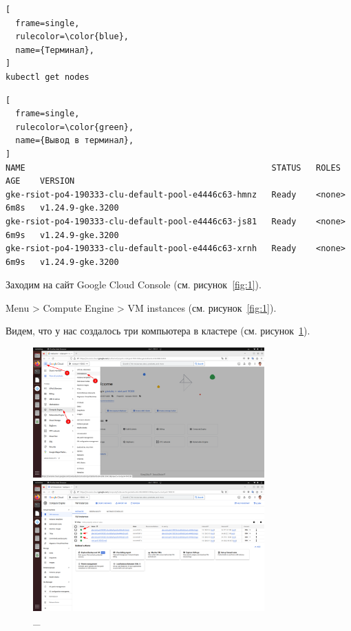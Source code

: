 \documentclass[12pt, a4paper, simple]{eskdtext}
\begin{document}
\newpage

\begin{lstlisting}[
  frame=single,
  rulecolor=\color{blue},
  name={Терминал},
]
kubectl get nodes
\end{lstlisting}

\begin{lstlisting}[
  frame=single,
  rulecolor=\color{green},
  name={Вывод в терминал},
]
NAME                                                  STATUS   ROLES    AGE    VERSION
gke-rsiot-po4-190333-clu-default-pool-e4446c63-hmnz   Ready    <none>   6m8s   v1.24.9-gke.3200
gke-rsiot-po4-190333-clu-default-pool-e4446c63-js81   Ready    <none>   6m9s   v1.24.9-gke.3200
gke-rsiot-po4-190333-clu-default-pool-e4446c63-xrnh   Ready    <none>   6m9s   v1.24.9-gke.3200
\end{lstlisting}

  Заходим на сайт Google Cloud Console \cite{GoogleCloudConsole} (см. рисунок~\ref{fig:1}).

  Menu > Compute Engine > VM instances (см. рисунок~\ref{fig:1}).

  Видем, что у нас создалось три компьютера в кластере (см. рисунок~\ref{fig:2}).

  \begin{figure}[!h]
    \centering

    \begin{minipage}{0.49\textwidth}
      \centering

      \includegraphics[height=5cm]
      {images/2023-03-03_00-53-23.png}

      \caption{\_}

      \label{fig:1}
    \end{minipage}
    \begin{minipage}{0.49\textwidth}
      \centering

      \includegraphics[height=5cm]
      {images/2023-03-03_00-53-56.png}

      \caption{\_}

      \label{fig:2}
    \end{minipage}
  \end{figure}
\end{document}
